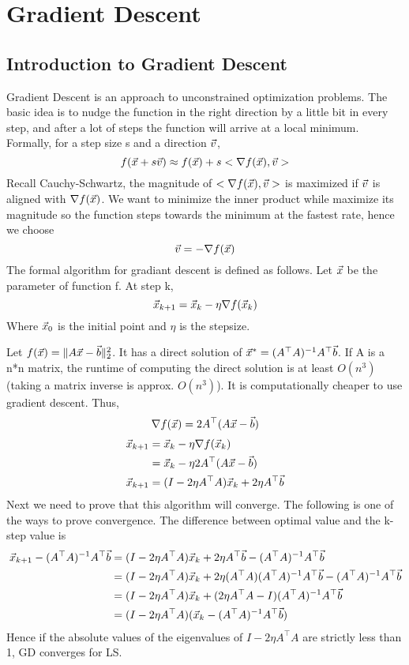 \section{Gradient Descent} %
\label{sec:gradient_descent}

\subsection{Introduction to Gradient Descent} %
\label{sub:introduction_to_gradient_descent}

\begin{definition}
	Gradient Descent is an approach to unconstrained optimization problems. The basic idea is to nudge the function in the right direction by a little bit in every step, and after a lot of steps the function will arrive at a local minimum. Formally, for a step size s and a direction $\vec{v}$,
	\[
f(\vec{x}+s\vec{v}) \approx f(\vec{x})+s<\nabla f(\vec{x}), \vec{v}>
	\]
	Recall Cauchy-Schwartz, the magnitude of $<\nabla f(\vec{x}), \vec{v}>$ is maximized if $\vec{v}$ is aligned with $\nabla f(\vec{x})$. We want to minimize the inner product while maximize its magnitude so the function steps towards the minimum at the fastest rate, hence we choose
	\[
\vec{v} = -\nabla f(\vec{x})
	\]
	The formal algorithm for gradiant descent is defined as follows. Let $\vec{x}$ be the parameter of function f. At step k,
	\[
\vec{x}_{k+1} = \vec{x}_k -\eta\nabla f(\vec{x}_k)
	\]
	Where $\vec{x}_0$ is the initial point and $\eta$ is the stepsize.
\end{definition}

\begin{example}[GD on LS]
	Let $f(\vec{x}) = \|A\vec{x}-\vec{b}\|_2^2$. It has a direct solution of $\vec{x}^* = (A^\top A)^{-1}A^\top\vec{b}$. If A is a n*n matrix, the runtime of computing the direct solution is at least $O(n^3)$ (taking a matrix inverse is approx. $O(n^3)$). It is computationally cheaper to use gradient descent. Thus,
	\[
\nabla f(\vec{x}) = 2A^\top(A\vec{x}-\vec{b})
	\]
\begin{align*}
	\vec{x}_{k+1} &= \vec{x}_k -\eta\nabla f(\vec{x}_k)\\
	&= \vec{x}_k - \eta 2A^\top(A\vec{x}-\vec{b})\\
	\vec{x}_{k+1} &= (I-2\eta A^\top A)\vec{x}_k + 2\eta A^\top\vec{b}
\end{align*}
	Next we need to prove that this algorithm will converge. The following is one of the ways to prove convergence. The difference between optimal value and the k-step value is
	\begin{align*}
		\vec{x}_{k+1} - (A^\top A)^{-1}A^\top\vec{b} &= (I-2\eta A^\top A)\vec{x}_k + 2\eta A^\top\vec{b} - (A^\top A)^{-1}A^\top\vec{b}\\
		&= (I-2\eta A^\top A)\vec{x}_k + 2\eta(A^\top A)(A^\top A)^{-1}A^\top\vec{b}-(A^\top A)^{-1}A^\top\vec{b}\\
		&= (I-2\eta A^\top A)\vec{x}_k + (2\eta A^\top A-I)(A^\top A)^{-1}A^\top\vec{b}\\
		&= (I-2\eta A^\top A)(\vec{x}_k - (A^\top A)^{-1}A^\top\vec{b})
	\end{align*}
	Hence if the absolute values of the eigenvalues of $I-2\eta A^\top A$ are strictly less than 1, GD converges for LS.
\end{example}

